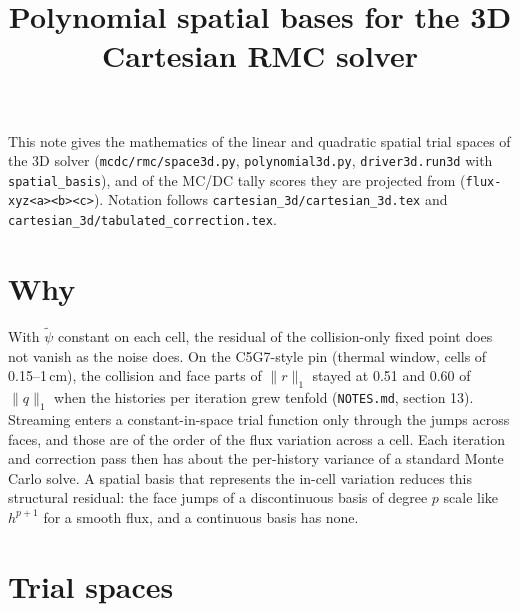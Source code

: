 \documentclass[11pt]{article}
\title{Polynomial spatial bases for the 3D Cartesian RMC solver}
\date{}
\newcommand{\tpsi}{\tilde\psi}
\begin{document}
\maketitle

\noindent This note gives the mathematics of the linear and quadratic spatial trial
spaces of the 3D solver (\texttt{mcdc/rmc/space3d.py}, \texttt{polynomial3d.py},
\texttt{driver3d.run3d} with \texttt{spatial\_basis}), and of the MC/DC tally scores
they are projected from (\texttt{flux-xyz<a><b><c>}). Notation follows
\texttt{cartesian\_3d/cartesian\_3d.tex} and
\texttt{cartesian\_3d/tabulated\_correction.tex}.

\section{Why}

With $\tpsi$ constant on each cell, the residual of the collision-only fixed point
does not vanish as the noise does. On the C5G7-style pin (thermal window, cells of
0.15--1\,cm), the collision and face parts of $\|r\|_1$ stayed at 0.51 and 0.60 of
$\|q\|_1$ when the histories per iteration grew tenfold (\texttt{NOTES.md}, section
13). Streaming enters a constant-in-space trial function only through the jumps
across faces, and those are of the order of the flux variation across a cell. Each
iteration and correction pass then has about the per-history variance of a
standard Monte Carlo solve. A spatial basis that represents the in-cell variation
reduces this structural residual: the face jumps of a discontinuous basis of degree
$p$ scale like $h^{p+1}$ for a smooth flux, and a continuous basis has none.

\section{Trial spaces}
\end{document}
